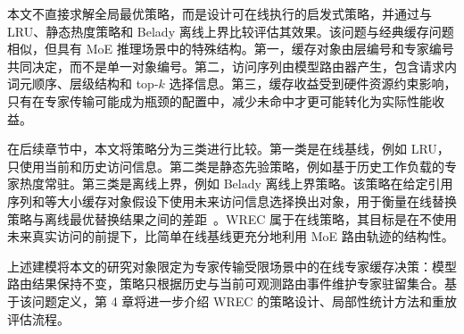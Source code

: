 本文不直接求解全局最优策略，而是设计可在线执行的启发式策略，并通过与 LRU、静态热度策略和 Belady 离线上界比较评估其效果。该问题与经典缓存问题相似，但具有 MoE 推理场景中的特殊结构。第一，缓存对象由层编号和专家编号共同决定，而不是单一对象编号。第二，访问序列由模型路由器产生，包含请求内 词元顺序、层级结构和 top-$k$ 选择信息。第三，缓存收益受到硬件资源约束影响，只有在专家传输可能成为瓶颈的配置中，减少未命中才更可能转化为实际性能收益。

在后续章节中，本文将策略分为三类进行比较。第一类是在线基线，例如 LRU，只使用当前和历史访问信息。第二类是静态先验策略，例如基于历史工作负载的专家热度常驻。第三类是离线上界，例如 Belady 离线上界策略。该策略在给定引用序列和等大小缓存对象假设下使用未来访问信息选择换出对象，用于衡量在线替换策略与离线最优替换结果之间的差距~\cite{belady1966study}。WREC 属于在线策略，其目标是在不使用未来真实访问的前提下，比简单在线基线更充分地利用 MoE 路由轨迹的结构性。

上述建模将本文的研究对象限定为专家传输受限场景中的在线专家缓存决策：模型路由结果保持不变，策略只根据历史与当前可观测路由事件维护专家驻留集合。基于该问题定义，第 4 章将进一步介绍 WREC 的策略设计、局部性统计方法和重放评估流程。
